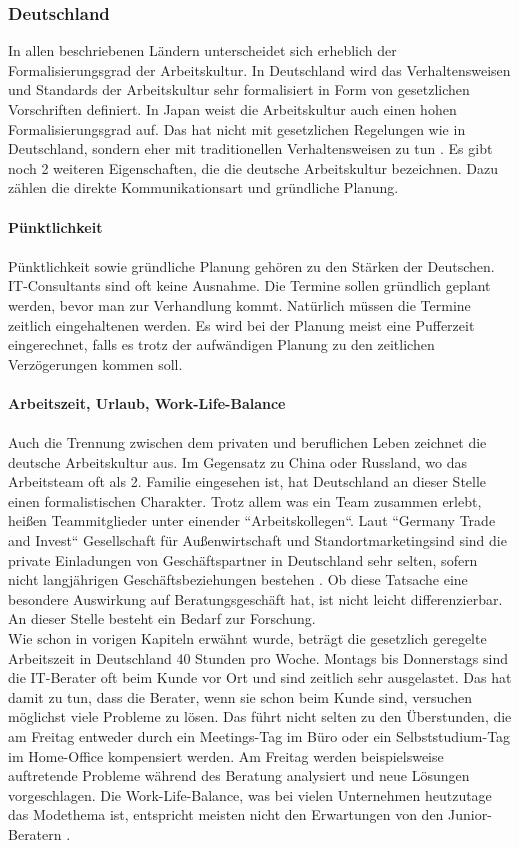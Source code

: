 	\subsubsection{Deutschland}
	In allen beschriebenen Ländern unterscheidet sich erheblich der Formalisierungsgrad der Arbeitskultur. In Deutschland wird das Verhaltensweisen und Standards der Arbeitskultur sehr formalisiert in Form von gesetzlichen Vorschriften definiert. In Japan weist die Arbeitskultur auch einen hohen Formalisierungsgrad auf. Das hat nicht mit gesetzlichen Regelungen wie in Deutschland, sondern eher mit traditionellen Verhaltensweisen zu tun \cite[236]{3LaenderVergl}. Es gibt noch 2 weiteren Eigenschaften, die die deutsche Arbeitskultur bezeichnen. Dazu zählen die direkte Kommunikationsart und gründliche Planung.\\ \\
	\textbf{Pünktlichkeit}\\ \\
	Pünktlichkeit sowie gründliche Planung gehören zu den Stärken der Deutschen. IT-Consultants sind oft keine Ausnahme. Die Termine sollen gründlich geplant werden, bevor man zur Verhandlung kommt. Natürlich müssen die Termine zeitlich eingehaltenen werden. Es wird bei der Planung meist eine Pufferzeit eingerechnet, falls es trotz der aufwändigen Planung zu den zeitlichen Verzögerungen kommen soll.\\ \\
	\textbf{Arbeitszeit, Urlaub, Work-Life-Balance 
	} \\ \\
	Auch die  Trennung zwischen dem privaten und beruflichen Leben zeichnet die  deutsche Arbeitskultur aus. Im Gegensatz zu China oder Russland, wo das Arbeitsteam oft als 2. Familie eingesehen ist, hat Deutschland an dieser Stelle einen formalistischen Charakter. Trotz allem was ein Team zusammen erlebt, heißen Teammitglieder unter einender ``Arbeitskollegen``. Laut ``Germany Trade and Invest``
	Gesellschaft für Außenwirtschaft und Standortmarketingsind sind die private Einladungen von Geschäftspartner in Deutschland sehr selten, sofern nicht langjährigen Geschäftsbeziehungen bestehen \cite{ArbKulturDE}. Ob diese Tatsache eine besondere Auswirkung auf Beratungsgeschäft hat, ist nicht leicht differenzierbar. An dieser Stelle besteht ein Bedarf zur Forschung. \\
	Wie schon in vorigen Kapiteln erwähnt wurde, beträgt die gesetzlich geregelte Arbeitszeit in Deutschland 40 Stunden pro Woche. Montags bis Donnerstags sind die IT-Berater oft beim Kunde vor Ort und sind zeitlich sehr ausgelastet. Das hat damit zu tun, dass die Berater, wenn sie schon beim Kunde sind, versuchen möglichst viele Probleme zu lösen. Das führt nicht selten zu den Überstunden, die am Freitag entweder durch ein Meetings-Tag im Büro oder ein Selbststudium-Tag im Home-Office kompensiert werden. Am Freitag werden beispielsweise auftretende Probleme während des Beratung analysiert und neue Lösungen vorgeschlagen. Die Work-Life-Balance, was bei vielen Unternehmen heutzutage das Modethema ist, entspricht meisten nicht den Erwartungen von den Junior-Beratern \cite{JNRBer}. 
